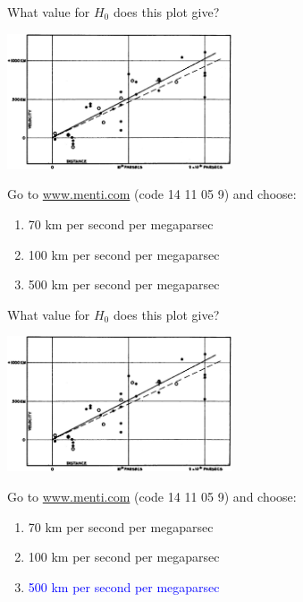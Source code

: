 \documentclass[usenames,dvipsnames,12pt,compress]{beamer}
\newcommand{\mentiurl}[0]{{\url{www.menti.com}}}
\newcommand{\menticode}[0]{{14 11 05 9}}
\newcommand{\mentiinvitation}[0]{Go to \mentiurl{} (code \menticode{}) and choose:\\}
\newcommand{\correctanswer}[1]{\textcolor{blue}{{#1} \checkmark}}
\begin{document}
\begin{frame}{What value for $H_0$ does this plot give?}
  \begin{block}{}
  \includegraphics[height=4cm]{F2.large.jpg}
  \end{block}
  \begin{block}{}
    \mentiinvitation{}
    \begin{enumerate}
      \item{70 km per second per megaparsec}
      \item{100 km per second per megaparsec}
      \item{500 km per second per megaparsec}
    \end{enumerate}
  \end{block}
\end{frame}


\begin{frame}{What value for $H_0$ does this plot give?}
  \begin{block}{}
  \includegraphics[height=4cm]{F2.large.jpg}
  \end{block}
  \begin{block}{}
    \mentiinvitation{}
    \begin{enumerate}
      \item{70 km per second per megaparsec}
      \item{100 km per second per megaparsec}
      \item{\correctanswer{500 km per second per megaparsec}}
    \end{enumerate}
  \end{block}
\end{frame}
\end{document}
